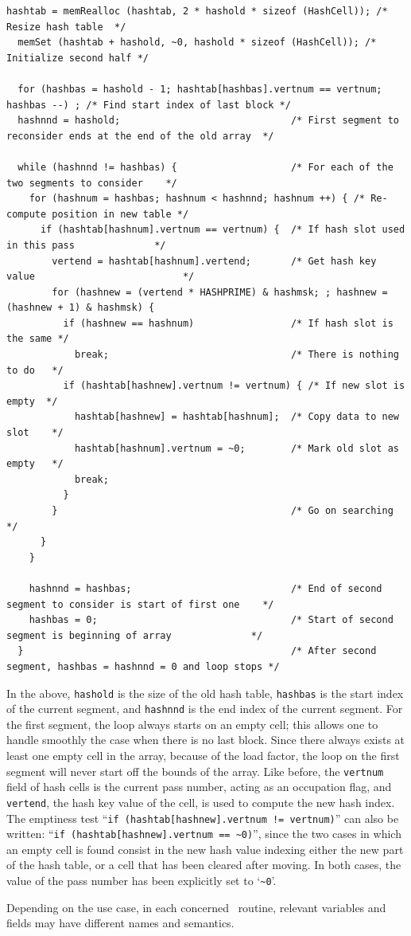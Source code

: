 \begin{lstlisting}[style=language-c]
  hashtab = memRealloc (hashtab, 2 * hashold * sizeof (HashCell)); /* Resize hash table  */
  memSet (hashtab + hashold, ~0, hashold * sizeof (HashCell)); /* Initialize second half */

  for (hashbas = hashold - 1; hashtab[hashbas].vertnum == vertnum; hashbas --) ; /* Find start index of last block */
  hashnnd = hashold;                              /* First segment to reconsider ends at the end of the old array  */

  while (hashnnd != hashbas) {                    /* For each of the two segments to consider    */
    for (hashnum = hashbas; hashnum < hashnnd; hashnum ++) { /* Re-compute position in new table */
      if (hashtab[hashnum].vertnum == vertnum) {  /* If hash slot used in this pass              */
        vertend = hashtab[hashnum].vertend;       /* Get hash key value                          */
        for (hashnew = (vertend * HASHPRIME) & hashmsk; ; hashnew = (hashnew + 1) & hashmsk) {
          if (hashnew == hashnum)                 /* If hash slot is the same */
            break;                                /* There is nothing to do   */
          if (hashtab[hashnew].vertnum != vertnum) { /* If new slot is empty  */
            hashtab[hashnew] = hashtab[hashnum];  /* Copy data to new slot    */
            hashtab[hashnum].vertnum = ~0;        /* Mark old slot as empty   */
            break;
          }
        }                                         /* Go on searching */
      }
    }

    hashnnd = hashbas;                            /* End of second segment to consider is start of first one    */
    hashbas = 0;                                  /* Start of second segment is beginning of array              */
  }                                               /* After second segment, hashbas = hashnnd = 0 and loop stops */
\end{lstlisting}

In the above, \texttt{hashold} is the size of the old hash table,
\texttt{hashbas} is the start index of the current segment, and
\texttt{hashnnd} is the end index of the current segment. For the
first segment, the loop always starts on an empty cell; this allows
one to handle smoothly the case when there is no last block. Since
there always exists at least one empty cell in the array, because of
the load factor, the loop on the first segment will never start off
the bounds of the array. Like before, the \texttt{vertnum} field of
hash cells is the current pass number, acting as an occupation flag,
and \texttt{vertend}, the hash key value of the cell, is used to
compute the new hash index. The emptiness test ``\texttt{if
(hashtab[hashnew].vertnum != vertnum)}'' can also be written:
``\texttt{if (hashtab[hashnew].vertnum == \~{}0)}'', since the two
cases in which an empty cell is found consist in the new hash value
indexing either the new part of the hash table, or a cell that has been
cleared after moving. In both cases, the value of the pass number has
been explicitly set to `\texttt{\~{}0}'.

Depending on the use case, in each concerned \scotch\ routine,
relevant variables and fields may have different names and semantics.
